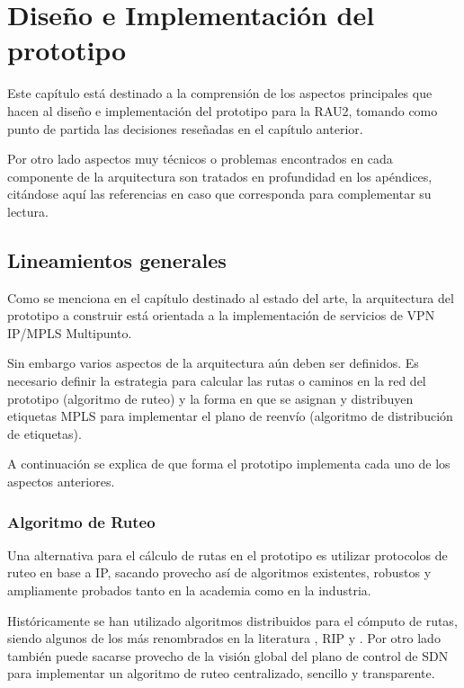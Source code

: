 \chapter{Dise\~no e Implementaci\'on del prototipo}

\ifpdf
    \graphicspath{{Chapter4/Figs/Raster/}{Chapter4/Figs/PDF/}{Chapter4/Figs/}}
\else
    \graphicspath{{Chapter4/Figs/Vector/}{Chapter4/Figs/}}
\fi

Este cap\'itulo est\'a destinado a la comprensi\'on de los aspectos principales que hacen al dise\~no e implementaci\'on del prototipo para la RAU2, tomando como punto de partida las decisiones reseñadas en el cap\'itulo anterior.

Por otro lado aspectos muy t\'ecnicos o problemas encontrados en cada componente de la arquitectura son tratados en profundidad en los ap\'endices, citándose aquí las referencias en caso que corresponda para complementar su lectura.

\section[Lineamientos generales]{Lineamientos generales}

Como se menciona en el cap\'itulo destinado al estado del arte, la arquitectura del prototipo a construir est\'a orientada a la implementaci\'on de servicios de VPN IP/MPLS Multipunto.

Sin embargo varios aspectos de la arquitectura a\'un deben ser definidos. Es necesario definir la estrategia para calcular las rutas o caminos en la red del prototipo (algoritmo de ruteo) y la forma en que se asignan y distribuyen etiquetas MPLS para implementar el plano de reenvío (algoritmo de distribución de etiquetas). 

A continuaci\'on se explica de que forma el prototipo implementa cada uno de los aspectos anteriores.

\subsection{Algoritmo de Ruteo}

Una alternativa para el c\'alculo de rutas en el prototipo es utilizar protocolos de ruteo en base a IP, sacando provecho as\'i de algoritmos existentes, robustos y ampliamente probados tanto en la academia como en la industria.

Hist\'oricamente se han utilizado algoritmos distribuidos para el c\'omputo de rutas, siendo algunos de los m\'as renombrados en la literatura  \cite{moy1998rfc}, RIP \cite{malkin1994rip} y  \cite{routingprotocol}. Por otro lado también puede sacarse provecho de la visi\'on global del plano de control de SDN para implementar un algoritmo de ruteo centralizado, sencillo y transparente.


